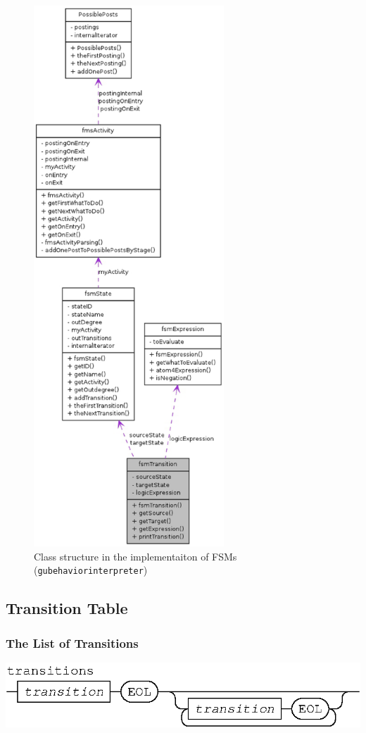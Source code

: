 \documentclass[11pt]{article}
\begin{document}
\begin{figure}
\includegraphics[height=8in]{classfsmTransition}
\caption{ Class structure in the implementaiton of FSMs ({\tt gubehaviorinterpreter})}
\end{figure}




\subsection{Transition Table}

\subsubsection{The List of Transitions}

\begin{center}
\includegraphics{transitions}
\end{center}
\end{document}
